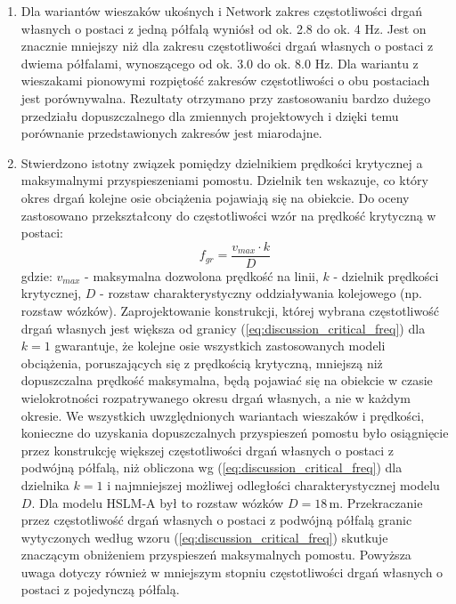 \begin{enumerate}
\item Dla wariantów wieszaków ukośnych i Network zakres częstotliwości drgań własnych o postaci z jedną półfalą wyniósł od ok. 2.8 do ok. 4 Hz. Jest on znacznie mniejszy niż dla zakresu częstotliwości drgań własnych o postaci z dwiema półfalami, wynoszącego od ok. 3.0 do ok. 8.0 Hz. Dla wariantu z wieszakami pionowymi rozpiętość zakresów częstotliwości o obu postaciach jest porównywalna. Rezultaty otrzymano przy zastosowaniu bardzo dużego przedziału dopuszczalnego dla zmiennych projektowych i dzięki temu porównanie przedstawionych zakresów jest miarodajne.

\item Stwierdzono istotny związek pomiędzy dzielnikiem prędkości krytycznej a maksymalnymi przyspieszeniami pomostu. Dzielnik ten wskazuje, co który okres drgań kolejne osie obciążenia pojawiają się na obiekcie. Do oceny zastosowano przekształcony do częstotliwości wzór na prędkość krytyczną w postaci:
\begin{equation} \label{eq:discussion_critical_freq}
	f_{gr} = \frac{v_{max}\cdot k}{D} 
\end{equation}
gdzie: $v_{max}$ - maksymalna dozwolona prędkość na linii, $k$ - dzielnik prędkości krytycznej, $D$ - rozstaw charakterystyczny oddziaływania kolejowego (np. rozstaw wózków). Zaprojektowanie konstrukcji, której wybrana częstotliwość drgań własnych jest większa od granicy (\ref{eq:discussion_critical_freq}) dla $k=1$ gwarantuje, że kolejne osie wszystkich zastosowanych modeli obciążenia, poruszających się z prędkością krytyczną, mniejszą niż dopuszczalna prędkość maksymalna, będą pojawiać się na obiekcie w czasie wielokrotności rozpatrywanego okresu drgań własnych, a nie w każdym okresie. We wszystkich uwzględnionych wariantach wieszaków i prędkości, konieczne do uzyskania dopuszczalnych przyspieszeń pomostu było osiągnięcie przez konstrukcję większej częstotliwości drgań własnych o postaci z podwójną półfalą, niż obliczona wg (\ref{eq:discussion_critical_freq}) dla dzielnika $k=1$ i najmniejszej możliwej odległości charakterystycznej modelu $D$. Dla modelu HSLM-A był to rozstaw wózków $D=18\,\mathrm{m}$. Przekraczanie przez częstotliwość drgań własnych o postaci z podwójną półfalą granic wytyczonych według wzoru (\ref{eq:discussion_critical_freq}) skutkuje znaczącym obniżeniem przyspieszeń maksymalnych pomostu. Powyższa uwaga dotyczy również w mniejszym stopniu częstotliwości drgań własnych o postaci z pojedynczą półfalą. 

\end{enumerate}

